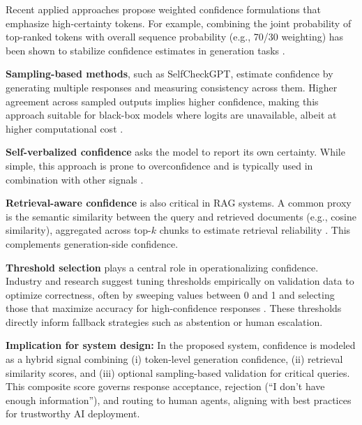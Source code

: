 Recent applied approaches propose weighted confidence formulations that emphasize high-certainty tokens. For example, combining the joint probability of top-ranked tokens with overall sequence probability (e.g., 70/30 weighting) has been shown to stabilize confidence estimates in generation tasks \cite{thomas2024confidence}.

\textbf{Sampling-based methods}, such as SelfCheckGPT, estimate confidence by generating multiple responses and measuring consistency across them. Higher agreement across sampled outputs implies higher confidence, making this approach suitable for black-box models where logits are unavailable, albeit at higher computational cost \cite{capgemini2024uncertainty}.

\textbf{Self-verbalized confidence} asks the model to report its own certainty. While simple, this approach is prone to overconfidence and is typically used in combination with other signals \cite{capgemini2024uncertainty}.

\textbf{Retrieval-aware confidence} is also critical in RAG systems. A common proxy is the semantic similarity between the query and retrieved documents (e.g., cosine similarity), aggregated across top-$k$ chunks to estimate retrieval reliability \cite{geeksforgeeks2024ragmetrics}. This complements generation-side confidence.

\textbf{Threshold selection} plays a central role in operationalizing confidence. Industry and research suggest tuning thresholds empirically on validation data to optimize correctness, often by sweeping values between 0 and 1 and selecting those that maximize accuracy for high-confidence responses \cite{mit2022overconfidence,cyara2023threshold}. These thresholds directly inform fallback strategies such as abstention or human escalation.

\textbf{Implication for system design:} In the proposed system, confidence is modeled as a hybrid signal combining (i) token-level generation confidence, (ii) retrieval similarity scores, and (iii) optional sampling-based validation for critical queries. This composite score governs response acceptance, rejection (“I don’t have enough information”), and routing to human agents, aligning with best practices for trustworthy AI deployment.


